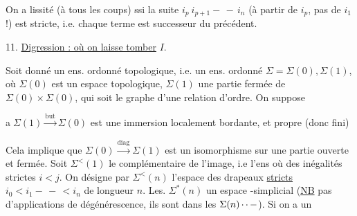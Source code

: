 On a lissité (à tous les coups) ssi  la suite $i_p\ i_{p+1}-\, -\,i_n$ (à partir de $i_p$, pas de $i_1$ !) est stricte, i.e. chaque terme  est successeur  du précédent.

11. \uline{Digression : où on laisse tomber} $I$.

Soit donné un ens. ordonné topologique, i.e. un  ens. ordonné $\Sigma=\Sigma(0),\Sigma(1)$, où $\Sigma(0)$ est un espace topologique, $\Sigma(1)$ une partie fermée de $\Sigma(0)\times\Sigma(0)$, qui soit le graphe d'une relation d'ordre. On suppose

\textcircled{a}\quad $\Sigma(1)\xrightarrow{\mathrm{but}}\Sigma(0)$ est une immersion localement bordante, et propre (donc fini)

 Cela implique que $\Sigma(0)\xrightarrow{\mathrm{diag}}\Sigma(1)$ est un isomorphisme sur une partie ouverte et fermée. Soit $\Sigma^{<}(1)$ le complémentaire de l'image, i.e l'ens où  des inégalités strictes $i<j$. On désigne par $\Sigma^{<}(n)$ l'espace des drapeaux \uline{stricts} $i_0<i_1-\, -\,<i_n$ de longueur $n$. Les. $\Sigma^*(n)$   un espace -simplicial (\uline{NB} pas d'applications de dégénérescence,  ils sont dans les $\Sigma(n)\mathinner{\cdotp\cdotp-}$).  Si on a un
